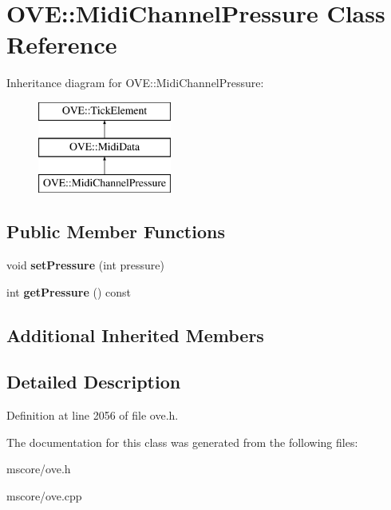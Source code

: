 \hypertarget{class_o_v_e_1_1_midi_channel_pressure}{}\section{O\+VE\+:\+:Midi\+Channel\+Pressure Class Reference}
\label{class_o_v_e_1_1_midi_channel_pressure}
Inheritance diagram for O\+VE\+:\+:Midi\+Channel\+Pressure\+:\begin{figure}[H]
\begin{center}
\leavevmode
\includegraphics[height=3.000000cm]{class_o_v_e_1_1_midi_channel_pressure}
\end{center}
\end{figure}
\subsection*{Public Member Functions}
\begin{DoxyCompactItemize}
\item 
\mbox{\label{class_o_v_e_1_1_midi_channel_pressure_a645284d0cb0878931de09927c11d0c7f}} 
void {\bfseries set\+Pressure} (int pressure)
\item 
\mbox{\label{class_o_v_e_1_1_midi_channel_pressure_aa0e23c7790e304db9b8cb45696a89a91}} 
int {\bfseries get\+Pressure} () const
\end{DoxyCompactItemize}
\subsection*{Additional Inherited Members}


\subsection{Detailed Description}


Definition at line 2056 of file ove.\+h.



The documentation for this class was generated from the following files\+:\begin{DoxyCompactItemize}
\item 
mscore/ove.\+h\item 
mscore/ove.\+cpp\end{DoxyCompactItemize}
